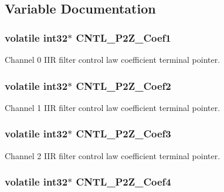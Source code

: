 \subsection{Variable Documentation}
\hypertarget{a00009_a047c759a71b80d8cfd5e6f52b1b021b9}{
\subsubsection[{C\-N\-T\-L\-\_\-2\-P2\-Z\-\_\-\-Coef1}]{\setlength{\rightskip}{0pt plus 5cm}volatile int32$\ast$ C\-N\-T\-L\-\_\-P2\-Z\-\_\-\-Coef1}}\label{a00009_a047c759a71b80d8cfd5e6f52b1b021b9}
Channel 0 I\-I\-R filter control law coefficient terminal pointer. \hypertarget{a00009_abdc599cbabc62898c49926678c3327e6}{
\subsubsection[{C\-N\-T\-L\-\_\-2\-P2\-Z\-\_\-\-Coef2}]{\setlength{\rightskip}{0pt plus 5cm}volatile int32$\ast$ C\-N\-T\-L\-\_\-P2\-Z\-\_\-\-Coef2}}\label{a00009_abdc599cbabc62898c49926678c3327e6}
Channel 1 I\-I\-R filter control law coefficient terminal pointer. \hypertarget{a00009_a1e357d296e76299ea04d7a63e4c46d1b}{
\subsubsection[{C\-N\-T\-L\-\_\-2\-P2\-Z\-\_\-\-Coef3}]{\setlength{\rightskip}{0pt plus 5cm}volatile int32$\ast$ C\-N\-T\-L\-\_\-P2\-Z\-\_\-\-Coef3}}\label{a00009_a1e357d296e76299ea04d7a63e4c46d1b}
Channel 2 I\-I\-R filter control law coefficient terminal pointer. \hypertarget{a00009_afe468cb1e995b267671e88b8d292aef6}{
\subsubsection[{C\-N\-T\-L\-\_\-2\-P2\-Z\-\_\-\-Coef4}]{\setlength{\rightskip}{0pt plus 5cm}volatile int32$\ast$ C\-N\-T\-L\-\_\-P2\-Z\-\_\-\-Coef4}}\label{a00009_afe468cb1e995b267671e88b8d292aef6}
